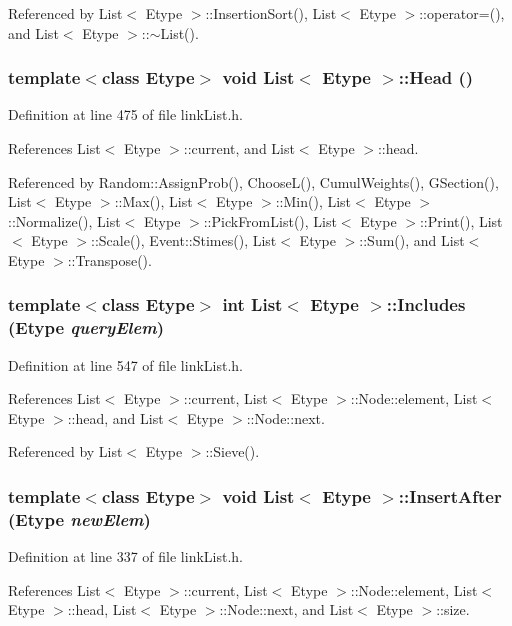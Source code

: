Referenced by List$<$ Etype $>$::Insertion\-Sort(), List$<$ Etype $>$::operator=(), and List$<$ Etype $>$::$\sim$List().
\subsubsection{\setlength{\rightskip}{0pt plus 5cm}template$<$class Etype$>$ void {\bf List}$<$ Etype $>$::Head ()}\label{classList_a11}




Definition at line 475 of file link\-List.h.

References List$<$ Etype $>$::current, and List$<$ Etype $>$::head.

Referenced by Random::Assign\-Prob(), Choose\-L(), Cumul\-Weights(), GSection(), List$<$ Etype $>$::Max(), List$<$ Etype $>$::Min(), List$<$ Etype $>$::Normalize(), List$<$ Etype $>$::Pick\-From\-List(), List$<$ Etype $>$::Print(), List$<$ Etype $>$::Scale(), Event::Stimes(), List$<$ Etype $>$::Sum(), and List$<$ Etype $>$::Transpose().
\subsubsection{\setlength{\rightskip}{0pt plus 5cm}template$<$class Etype$>$ int {\bf List}$<$ Etype $>$::Includes (Etype {\em query\-Elem})}\label{classList_a16}




Definition at line 547 of file link\-List.h.

References List$<$ Etype $>$::current, List$<$ Etype $>$::Node::element, List$<$ Etype $>$::head, and List$<$ Etype $>$::Node::next.

Referenced by List$<$ Etype $>$::Sieve().
\subsubsection{\setlength{\rightskip}{0pt plus 5cm}template$<$class Etype$>$ void {\bf List}$<$ Etype $>$::Insert\-After (Etype {\em new\-Elem})}\label{classList_a6}




Definition at line 337 of file link\-List.h.

References List$<$ Etype $>$::current, List$<$ Etype $>$::Node::element, List$<$ Etype $>$::head, List$<$ Etype $>$::Node::next, and List$<$ Etype $>$::size.

